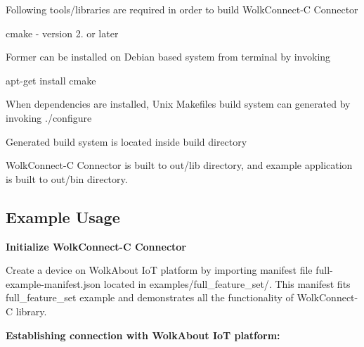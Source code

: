 Following tools/libraries are required in order to build Wolk\+Connect-\/C Connector


\begin{DoxyItemize}
\item cmake -\/ version 2. or later
\end{DoxyItemize}

Former can be installed on Debian based system from terminal by invoking

{\ttfamily apt-\/get install cmake}

When dependencies are installed, Unix Makefiles build system can generated by invoking {\ttfamily ./configure}

Generated build system is located inside \textquotesingle{}build\textquotesingle{} directory

Wolk\+Connect-\/C Connector is built to {\ttfamily out/lib} directory, and example application is built to {\ttfamily out/bin} directory.

\subsection*{Example Usage }

{\bfseries Initialize Wolk\+Connect-\/C Connector}

Create a device on Wolk\+About IoT platform by importing manifest file {\ttfamily full-\/example-\/manifest.\+json} located in {\ttfamily examples/full\+\_\+feature\+\_\+set/}. This manifest fits {\ttfamily full\+\_\+feature\+\_\+set} example and demonstrates all the functionality of Wolk\+Connect-\/C library.

{\bfseries Establishing connection with Wolk\+About IoT platform\+:}


